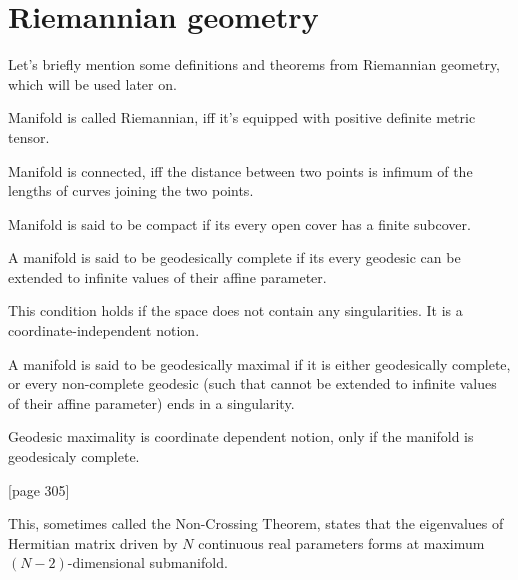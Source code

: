 
\section{Riemannian geometry}
Let's briefly mention some definitions and theorems from Riemannian geometry, which will be used later on.
\begin{definition}
    Manifold is called Riemannian, iff it's equipped with positive definite metric tensor.
\end{definition}
\begin{definition}
    Manifold is connected, iff the distance between two points is infimum of the lengths of curves joining the two points.
\end{definition}
\begin{definition}
    Manifold is said to be compact if its every open cover has a finite subcover.
\end{definition}
\begin{definition}
    A manifold is said to be geodesically complete if its every geodesic can be extended to infinite values of their affine parameter. 
\end{definition}
This condition holds if the space does not contain any singularities. It is a coordinate-independent notion.
\begin{definition}
    A manifold is said to be geodesically maximal if it is either geodesically complete, or every non-complete geodesic (such that cannot be extended to infinite values of their affine parameter) ends in a singularity.
\end{definition}
Geodesic maximality is coordinate dependent notion, only if the manifold is geodesicaly complete.


\begin{thm}\citep{landau}[page 305]
    \label{thm:n-2}

    This, sometimes called the Non-Crossing Theorem, states that the eigenvalues of Hermitian matrix driven by $N$ continuous real parameters forms at maximum $(N-2)$-dimensional submanifold.
\end{thm}


